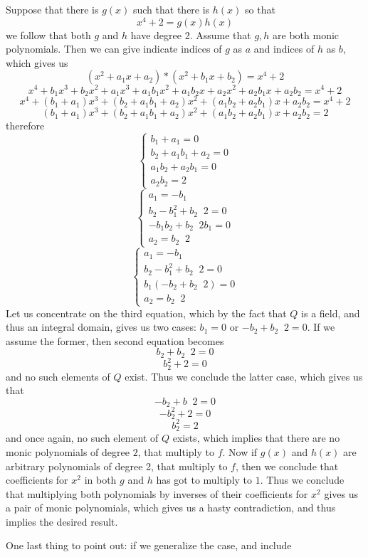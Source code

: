 \documentclass[11pt,oneside,titlepage]{book}
\DeclareMathOperator \inv {^{-1}}
\begin{document}
Suppose that there is $g(x)$ such that there is $h(x)$
so that
$$x^4 + 2 = g(x) h(x)$$
we follow that both $g$ and $h$ have degree 2. Assume that $g, h$ are
both monic polynomials. Then we can give indicate indices of $g$ as $a$ and
indices of $h$ as $b$, which gives us
$$(x^2 + a_1 x + a_2) * (x^2 + b_1 x + b_2) = x^4 + 2$$
$$x^4 + b_1 x^3 + b_2 x^2 + a_1 x^3 + a_1 b_1 x^2 + a_1 b_2 x + a_2 x^2 + a_2 b_1 x + a_2 b_2 = x^4 + 2$$
$$x^4 + (b_1 + a_1)x^3 + (b_2 + a_1 b_1 + a_2)x^2 + (a_1 b_2 + a_2 b_1) x + a_2 b_2 = x^4 + 2$$
$$(b_1 + a_1)x^3 + (b_2 + a_1 b_1 + a_2)x^2 + (a_1 b_2 + a_2 b_1) x + a_2 b_2 = 2$$
therefore
$$
\begin{cases}
  b_1 + a_1 = 0 \\
  b_2 + a_1b_1 + a_2 = 0 \\
  a_1 b_2 + a_2 b_1 = 0 \\
  a_2 b_2 = 2
\end{cases}
$$
$$
\begin{cases}
  a_1 = -b_1 \\
  b_2 -  b_1^2 + b_2\inv 2 = 0 \\
  -b_1 b_2 +  b_2\inv 2 b_1 = 0 \\
  a_2 = b_2\inv 2
\end{cases}
$$
$$
\begin{cases}
  a_1 = -b_1 \\
  b_2 -  b_1^2 + b_2\inv 2 = 0 \\
  b_1 (- b_2 +  b_2\inv 2) = 0 \\
  a_2 = b_2\inv 2
\end{cases}
$$
Let us concentrate on the third equation, which by the fact that $Q$ is a field,
and thus an integral domain, gives us two cases: $b_1 = 0$ or $-b_2 +
b_2\inv 2 = 0$. If we assume the former, then second equation becomes
$$b_2 + b_2 \inv 2 = 0$$
$$b_2^2 + 2 = 0$$
and no such elements of $Q$ exist. Thus we conclude the latter case, which gives us that
$$- b_2  + b\inv 2 = 0$$
$$- b_2^2  + 2 = 0$$
$$b_2^2  = 2$$
and once again, no such element of $Q$ exists, which implies that
there are no monic polynomials of degree $2$, that multiply to $f$. Now if
$g(x)$ and $h(x)$ are arbitrary polynomials of degree 2, that multiply to $f$,
then we conclude that coefficients for $x^2$ in both $g$ and $h$ has got to
multiply to $1$. Thus we conclude that multiplying both polynomials by
inverses of their coefficients for $x^2$ gives us a pair of monic
polynomials, which gives us a hasty contradiction, and thus implies the desired
result.

One last thing to point out: if we generalize the case, and include 
\end{document}

